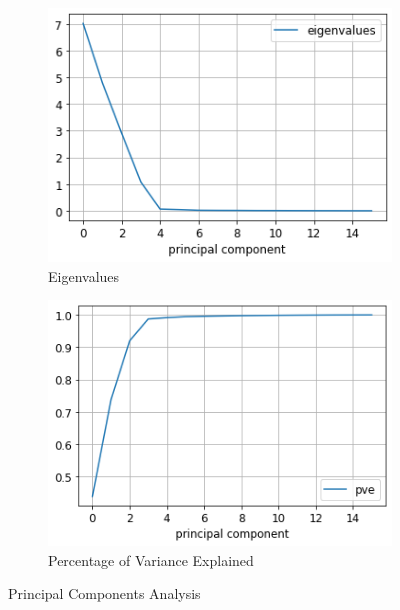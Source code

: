 \documentclass{homework}
\begin{document}
\begin{figure}[h]
\begin{subfigure}{0.45\textwidth}
\includegraphics[width=\linewidth]{h1_pca_eigen.png}
\caption{Eigenvalues}
\end{subfigure}
\hfill %
\begin{subfigure}{0.45\textwidth}
\includegraphics[width=\linewidth]{h1_pca_pve.png}
\caption{Percentage of Variance Explained}
\end{subfigure}
\caption{Principal Components Analysis}
\label{pca}
\end{figure}
\end{document}
